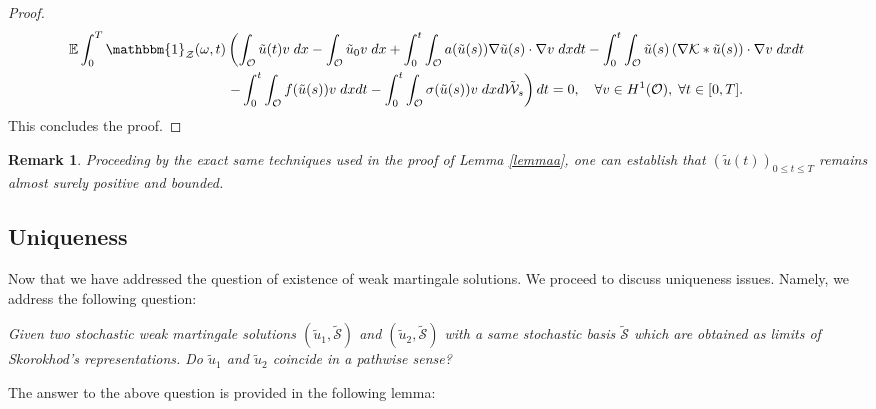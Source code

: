 \documentclass[10pt,number,preprint,times]{elsarticle}
\numberwithin{equation}{section} %
\newtheorem{rem}{Remark}[section]
\begin{document}
\begin{proof}
\begin{align*}
	\mathbb{E} \int_0^T \mathbbm{1}_{\mathcal{Z}}(\omega,t)&\left( \int_\mathcal{O} \tilde{u}(t)v\; dx-\int_\mathcal{O} \tilde{u}_0 v\; dx+ \int_{0}^t \int_{\mathcal{O}} a(\tilde{u}(s))\nabla \tilde{u}(s) \cdot \nabla v\; dxdt-\int_{0}^t \int_{\mathcal{O}} \tilde{u}(s)\left(\nabla \mathcal{K} \ast \tilde{u}(s)\right) \cdot \nabla v\; dxdt \right.\\
	&\left. -\int_{0}^t \int_{\mathcal{O}} f(\tilde{u}(s)) v\; dxdt-\int_{0}^t \int_{\mathcal{O}} \sigma(\tilde{u}(s)) v\; dx d\tilde{\mathcal{W}}_s\right)dt=0, \quad \forall v \in H^1(\mathcal{O}), \; \forall t \in [0,T].
\end{align*}
This concludes the proof.
\end{proof}
\begin{rem}
Proceeding by the exact same techniques used in the proof of Lemma \ref{lemmaa}, one can establish that $(\tilde{u}(t))_{0 \leq t \leq T}$ remains almost surely positive and bounded. 
\end{rem}
\subsection{Uniqueness}
Now that we have addressed the question of existence of weak martingale solutions. We proceed to discuss uniqueness issues. Namely, we address the following question:

\noindent 
\textit{Given two stochastic weak martingale solutions $\left(\tilde{u}_1,\tilde{\mathcal{S}}\right)$ and $\left(\tilde{u}_2,\tilde{\mathcal{S}}\right)$ with a same stochastic basis $\tilde{\mathcal{S}}$ which are obtained as limits of Skorokhod's representations. Do $\tilde{u}_1$ and $\tilde{u}_2$ coincide in a pathwise sense?}

\noindent
The answer to the above question is provided in the following lemma:
\end{document}
